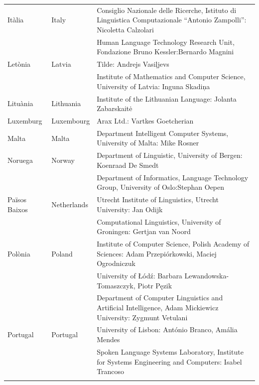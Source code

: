 \begin{multicols}{2}
\begin{itemize}
\begin{longtable}{@{}llp{113mm}@{}}
  Itàlia & \textcolor{grey1}{Italy} & Consiglio Nazionale delle Ricerche, Istituto di Linguistica Computazionale “Antonio Zampolli”: Nicoletta Calzolari\\ \addlinespace
  & & Human Language Technology Research Unit, Fondazione Bruno Kessler:\newline Bernardo Magnini\\ \addlinespace 
  Letònia & \textcolor{grey1}{Latvia} & Tilde: Andrejs Vasiļjevs\\ \addlinespace 
  & & Institute of Mathematics and Computer Science, University of Latvia: Inguna Skadiņa\\ \addlinespace
  Lituània & \textcolor{grey1}{Lithuania} & Institute of the Lithuanian Language: Jolanta Zabarskaitė\\ \addlinespace
  Luxemburg & \textcolor{grey1}{Luxembourg} & Arax Ltd.: Vartkes Goetcherian\\ \addlinespace
  Malta & \textcolor{grey1}{Malta} & Department Intelligent Computer Systems, University of Malta: Mike Rosner\\ \addlinespace
  Noruega & \textcolor{grey1}{Norway} & Department of Linguistic, University of Bergen: Koenraad De Smedt\\ \addlinespace 
  & & Department of Informatics, Language Technology Group, University of Oslo:\newline Stephan Oepen \\ \addlinespace
  Països Baixos & \textcolor{grey1}{Netherlands} & Utrecht Institute of Linguistics, Utrecht University: Jan Odijk\\ \addlinespace 
  & & Computational Linguistics, University of Groningen: Gertjan van Noord\\ \addlinespace
  Polònia & \textcolor{grey1}{Poland} & Institute of Computer Science, Polish Academy of Sciences: Adam Przepiórkowski, Maciej Ogrodniczuk \\ \addlinespace
  & & University of Łódź: Barbara Lewandowska-Tomaszczyk, Piotr Pęzik\\ \addlinespace
  & & Department of Computer Linguistics and Artificial Intelligence, Adam Mickiewicz University: Zygmunt Vetulani \\ \addlinespace
  Portugal & \textcolor{grey1}{Portugal} & University of Lisbon: António Branco, Amália Mendes \\ \addlinespace
  & & Spoken Language Systems Laboratory, Institute for Systems Engineering and Computers: Isabel Trancoso \\ \addlinespace

\end{longtable}
\end{itemize}
\end{multicols}
